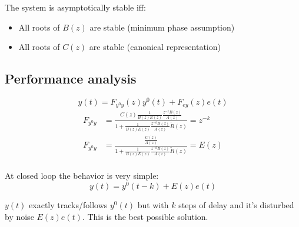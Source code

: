 The system is asymptotically stable iff:
\begin{itemize}
    \item All roots of $B(z)$ are stable (minimum phase assumption)
    \item All roots of $C(z)$ are stable (canonical representation)
\end{itemize}

\subsection{Performance analysis}

\[
    y(t) = F_{y^0y}(z)y^0(t) + F_{ey}(z)e(t)
\]
\begin{align*}
    F_{y^0y} &= \frac{ C(z) \frac{1}{B(z)E(z)}\frac{z^{-k}B(z)}{A(z)} }{1 + \frac{1}{B(z)E(z)}\frac{z^{-k}B(z)}{A(z)}\tilde{R}(z) } = z^{-k} \\
    F_{y^0y} &= \frac{ \frac{C(z)}{A(z)}}{1 + \frac{1}{B(z)E(z)}\frac{z^{-k}B(z)}{A(z)}\tilde{R}(z) } = E(z)\\
\end{align*}

At closed loop the behavior is very simple:
\[
    y(t) = y^0(t-k)+E(z)e(t)
\]

$y(t)$ exactly tracks/follows $y^0(t)$ but with $k$ steps of delay and it's disturbed by noise $E(z)e(t)$.
This is the best possible solution.

